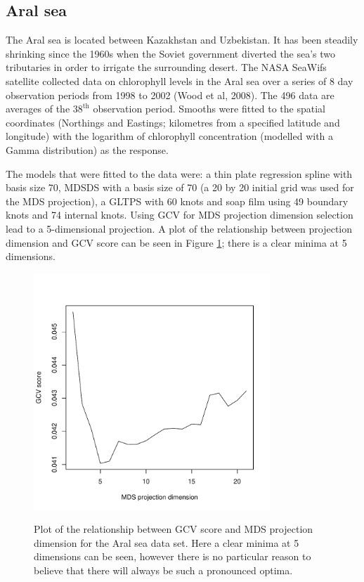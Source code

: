 \documentclass[useAMS, referee]{biom}
\begin{document}
\subsection{Aral sea}

The Aral sea is located between Kazakhstan and Uzbekistan. It has been steadily shrinking since the 1960s when the Soviet government diverted the sea's two tributaries in order to irrigate the surrounding desert. The NASA SeaWifs satellite collected data on chlorophyll levels in the Aral sea over a series of 8 day observation periods from 1998 to 2002 (Wood et al, 2008). The 496 data are averages of the $38^\text{th}$ observation period. Smooths were fitted to the spatial coordinates (Northings and Eastings; kilometres from a specified latitude and longitude) with the logarithm of chlorophyll concentration (modelled with a Gamma distribution) as the response.

The models that were fitted to the data were: a thin plate regression spline with basis size 70, MDSDS with a basis size of 70 (a 20 by 20 initial grid was used for the MDS projection), a GLTPS with 60 knots and soap film using 49 boundary knots and 74 internal knots. Using GCV for MDS projection dimension selection lead to a 5-dimensional projection. A plot of the relationship between projection dimension and GCV score can be seen in Figure \ref{aral-gcvplot}; there is a clear minima at 5 dimensions.

\begin{figure}
\centering
\includegraphics[width=3.5in]{examples/aral/aral-gcvplot.pdf} \\
\caption{Plot of the relationship between GCV score and MDS projection dimension for the Aral sea data set. Here a clear minima at 5 dimensions can be seen, however there is no particular reason to believe that there will always be such a pronounced optima.}
\label{aral-gcvplot}
\end{figure}
\end{document}
